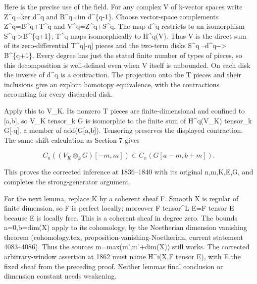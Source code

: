 \documentclass[11pt]{article}
\begin{document}
Here is the precise use of the field. For any complex V of k-vector spaces write Z\textasciicircum{}q\allowbreak{}=ker d\^{}q and B\textasciicircum{}q\allowbreak{}=im d\^{}\{q-1\}. Choose vector-space complements Z\textasciicircum{}q\allowbreak{}=B\textasciicircum{}q\allowbreak{}+T\textasciicircum{}q and V\textasciicircum{}q\allowbreak{}=Z\textasciicircum{}q\allowbreak{}+S\textasciicircum{}q. The map d\^{}q restricts to an isomorphism S\textasciicircum{}q\allowbreak{}->B\textasciicircum{}\{q\allowbreak{}+1\}; T\^{}q maps isomorphically to H\textasciicircum{}q(V)\allowbreak{}. Thus V is the direct sum of its zero-differential T\textasciicircum{}q[-q]\allowbreak{} pieces and the two-term disks S\^{}q --d\textasciicircum{}q-\allowbreak{}-> B\textasciicircum{}\{q\allowbreak{}+1\}. Every degree has just the stated finite number of types of pieces,\allowbreak{} so this decomposition is well-defined even when V itself is unbounded. On each disk the inverse of d\^{}q is a contraction. The projection onto the T pieces and their inclusions give an explicit homotopy equivalence,\allowbreak{} with the contractions accounting for every discarded disk.

Apply this to V\_\allowbreak{}K. Its nonzero T pieces are finite-dimensional and confined to [a,\allowbreak{}b]\allowbreak{},\allowbreak{} so V\_\allowbreak{}K tensor\_\allowbreak{}k G is isomorphic to the finite sum of H\textasciicircum{}q(V\_\allowbreak{}K)\allowbreak{} tensor\_\allowbreak{}k G[-q]\allowbreak{},\allowbreak{} a member of add(G[a,\allowbreak{}b]\allowbreak{})\allowbreak{}. Tensoring preserves the displayed contraction. The same shift calculation as Section 7 gives

\[
 C_n((V_K\otimes_k G)[-m,m])
       \subset C_n(G[a-m,b+m]).
\]

This proves the corrected inference at 1836–\allowbreak{}1840 with its original n,\allowbreak{}m,\allowbreak{}K,\allowbreak{}E,\allowbreak{}G,\allowbreak{} and completes the strong-generator argument.

For the next lemma,\allowbreak{} replace K by a coherent sheaf F. Smooth X is regular of finite dimension,\allowbreak{} so F is perfect locally; moreover F tensor\^{}L E\allowbreak{}=F tensor E because E is locally free. This is a coherent sheaf in degree zero. The bounds a\allowbreak{}=0,\allowbreak{}b\allowbreak{}=dim(X)\allowbreak{} apply to its cohomology,\allowbreak{} by the Noetherian dimension vanishing theorem (cohomology.tex,\allowbreak{} proposition-vanishing-Noetherian,\allowbreak{} current statement 4083–\allowbreak{}4086)\allowbreak{}. Thus the source\textquotesingle s m\allowbreak{}=max(m',\allowbreak{}m'\allowbreak{}+dim(X)\allowbreak{})\allowbreak{} still works. The corrected arbitrary-window assertion at 1862 must name H\textasciicircum{}i(X,\allowbreak{}F tensor E)\allowbreak{},\allowbreak{} with E the fixed sheaf from the preceding proof. Neither lemma\textquotesingle s final conclusion or dimension constant needs weakening.
\end{document}
